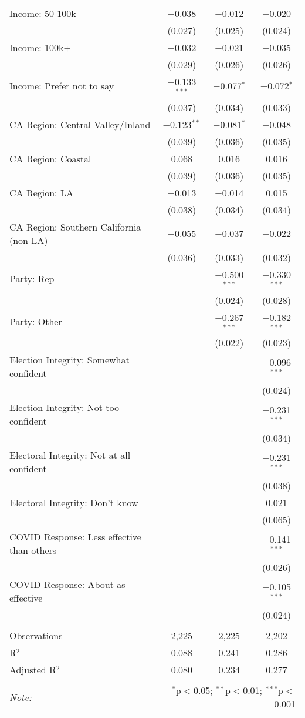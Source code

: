 \begin{table}[!htbp]
\begin{tabular}{@{\extracolsep{5pt}}lccc}
  Income: 50-100k & $-$0.038 & $-$0.012 & $-$0.020 \\ 
  & (0.027) & (0.025) & (0.024) \\ 
  Income: 100k+ & $-$0.032 & $-$0.021 & $-$0.035 \\ 
  & (0.029) & (0.026) & (0.026) \\ 
  Income: Prefer not to say & $-$0.133$^{***}$ & $-$0.077$^{*}$ & $-$0.072$^{*}$ \\ 
  & (0.037) & (0.034) & (0.033) \\ 
  CA Region: Central Valley/Inland & $-$0.123$^{**}$ & $-$0.081$^{*}$ & $-$0.048 \\ 
  & (0.039) & (0.036) & (0.035) \\ 
  CA Region: Coastal & 0.068 & 0.016 & 0.016 \\ 
  & (0.039) & (0.036) & (0.035) \\ 
  CA Region: LA & $-$0.013 & $-$0.014 & 0.015 \\ 
  & (0.038) & (0.034) & (0.034) \\ 
  CA Region: Southern California (non-LA) & $-$0.055 & $-$0.037 & $-$0.022 \\ 
  & (0.036) & (0.033) & (0.032) \\ 
  Party: Rep &  & $-$0.500$^{***}$ & $-$0.330$^{***}$ \\ 
  &  & (0.024) & (0.028) \\ 
  Party: Other &  & $-$0.267$^{***}$ & $-$0.182$^{***}$ \\ 
  &  & (0.022) & (0.023) \\ 
  Election Integrity: Somewhat confident &  &  & $-$0.096$^{***}$ \\ 
  &  &  & (0.024) \\ 
  Election Integrity: Not too confident &  &  & $-$0.231$^{***}$ \\ 
  &  &  & (0.034) \\ 
  Electoral Integrity: Not at all confident &  &  & $-$0.231$^{***}$ \\ 
  &  &  & (0.038) \\ 
  Electoral Integrity: Don't know &  &  & 0.021 \\ 
  &  &  & (0.065) \\ 
  COVID Response: Less effective than others &  &  & $-$0.141$^{***}$ \\ 
  &  &  & (0.026) \\ 
  COVID Response: About as effective &  &  & $-$0.105$^{***}$ \\ 
  &  &  & (0.024) \\ 
 \hline \\[-1.8ex] 
Observations & 2,225 & 2,225 & 2,202 \\ 
R$^{2}$ & 0.088 & 0.241 & 0.286 \\ 
Adjusted R$^{2}$ & 0.080 & 0.234 & 0.277 \\ 
\hline 
\hline \\[-1.8ex] 
\textit{Note:}  & \multicolumn{3}{r}{$^{*}$p$<$0.05; $^{**}$p$<$0.01; $^{***}$p$<$0.001} \\ 
\end{tabular} 
\end{table} 
